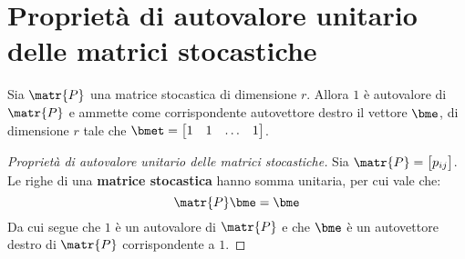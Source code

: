 \documentclass[\main/main.tex]{subfiles}
\begin{document}
\section{Proprietà di autovalore unitario delle matrici stocastiche}
\begin{theorem}
  Sia \(\matr{P}\) una matrice stocastica di dimensione \(r\). Allora \(1\) è autovalore di \(\matr{P}\) e ammette come corrispondente autovettore destro il vettore \(\bme \), di dimensione \(r\) tale che \(\bmet = \begin{bmatrix}
    1 & 1 & \ldots & 1
  \end{bmatrix}\).
\end{theorem}
\begin{proof}[Proprietà di autovalore unitario delle matrici stocastiche]
  Sia \(\matr{P} = \begin{bmatrix}
    p_{ij}
  \end{bmatrix}\). Le righe di una \textbf{matrice stocastica} hanno somma unitaria, per cui vale che:
  \[
    \matr{P}\bme = \bme
  \]
  Da cui segue che \(1\) è un autovalore di \(\matr{P}\) e che \(\bme \) è un autovettore destro di \(\matr{P}\) corrispondente a \(1\).
\end{proof}
\end{document}
